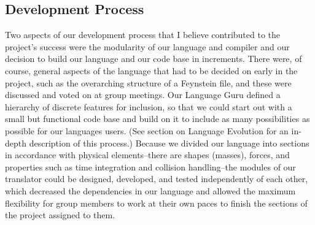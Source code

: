 \subsection{Development Process}
Two aspects of our development process that I believe contributed to
the project’s success were the modularity of our language and compiler
and our decision to build our language and our code base in
increments. There were, of course, general aspects of the language
that had to be decided on early in the project, such as the
overarching structure of a Feynstein file, and these were discussed
and voted on at group meetings. Our Language Guru defined a hierarchy
of discrete features for inclusion, so that we could start out with a
small but functional code base and build on it to include as many
possibilities as possible for our languages users. (See section on
Language Evolution for an in-depth description of this process.)
Because we divided our language into sections in accordance with
physical elements--there are shapes (masses), forces, and properties
such as time integration and collision handling--the modules of our
translator could be designed, developed, and tested independently of
each other, which decreased the dependencies in our language and
allowed the maximum flexibility for group members to work at their own
paces to finish the sections of the project assigned to them.

